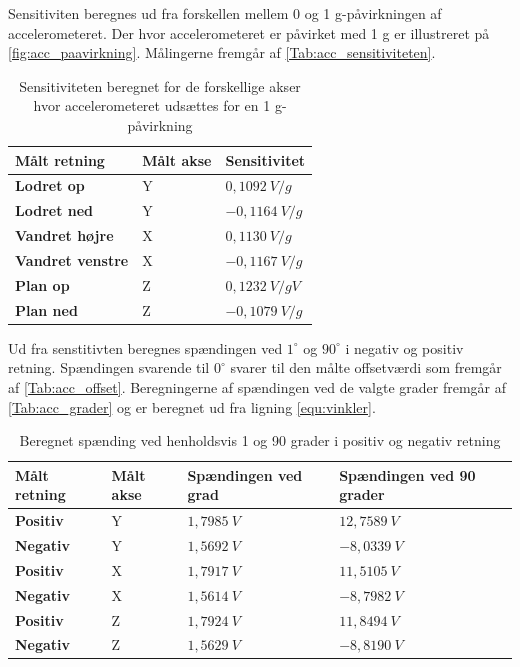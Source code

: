 Sensitiviten beregnes ud fra forskellen mellem 0 og 1 g-påvirkningen af accelerometeret. Der hvor accelerometeret er påvirket med 1 g er illustreret på \autoref{fig:acc_paavirkning}. Målingerne fremgår af \autoref{Tab:acc_sensitiviteten}. 

\begin{table}[H]
	\centering
	\begin{tabular}{|l|l|l|}
	\textbf{Målt retning} & \textbf{Målt akse} & \textbf{Sensitivitet} \\ \hline
    \textbf{Lodret op} 		& Y		& $0,1092~V/g$ 	\\ \hline
    \textbf{Lodret ned}		& Y 		& $-0,1164~V/g$ 	\\ \hline
    \textbf{Vandret højre} 	& X 		& $0,1130~V/g$     \\ \hline     
    \textbf{Vandret venstre}	& X 		& $-0,1167~V/g$ 	\\ \hline
    \textbf{Plan op} 		& Z 		& $0,1232~V/gV$    	\\ \hline		
    \textbf{Plan ned} 		& Z 		& $-0,1079~V/g$		\\ \hline
	\end{tabular}
	\caption{Sensitiviteten beregnet for de forskellige akser hvor accelerometeret udsættes for en 1 g-påvirkning}
	\label{Tab:acc_offset}
\end{table}

Ud fra senstitivten beregnes spændingen ved $1^{\circ}$ og $90^{\circ}$ i negativ og positiv retning. Spændingen svarende til $0^{\circ}$ svarer til den målte offsetværdi som fremgår af \autoref{Tab:acc_offset}. Beregningerne af spændingen ved de valgte grader fremgår af \autoref{Tab:acc_grader} og er beregnet ud fra ligning \autoref{equ:vinkler}.

 \begin{table}[H]
	\centering
	\begin{tabular}{|l|l|l|l|}
	\textbf{Målt retning} & \textbf{Målt akse} & \textbf{Spændingen ved grad} & \textbf{Spændingen ved 90 grader} \\ \hline
    \textbf{Positiv} 	& Y		& $1,7985~V$   	&	$12,7589~V$\\ \hline
    \textbf{Negativ}		& Y		& $1,5692~V$  	&	$-8,0339~V$\\ \hline
    \textbf{Positiv} 	& X 		& $1,7917~V$   	& 	$11,5105~V$ \\ \hline     
    \textbf{Negativ}		& X 		& $1,5614~V$		&	$-8,7982~V$\\ \hline
    \textbf{Positiv} 	& Z 		& $1,7924~V$   	& 	$11,8494~V$	\\ \hline		
    \textbf{Negativ} 	& Z 		& $1,5629~V$		&	$-8,8190~V$ \\ \hline
	\end{tabular}
	\caption{Beregnet spænding ved henholdsvis 1 og 90 grader i positiv og negativ retning}
	\label{Tab:acc_grader}
\end{table}





